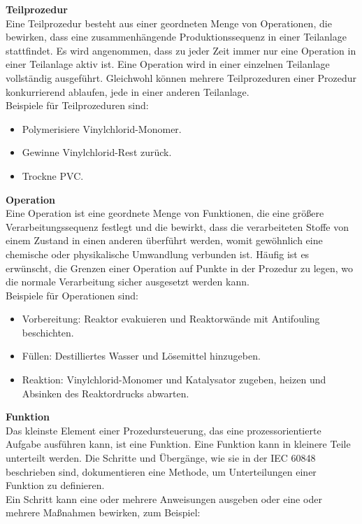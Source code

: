 \textbf{Teilprozedur}\\
Eine Teilprozedur besteht aus einer geordneten Menge von Operationen, die bewirken, dass eine zusammenhängende Produktionssequenz in einer Teilanlage stattfindet. Es wird angenommen, dass zu jeder Zeit immer nur eine Operation in einer Teilanlage aktiv ist. Eine Operation wird in einer einzelnen Teilanlage vollständig ausgeführt. Gleichwohl können mehrere Teilprozeduren einer Prozedur konkurrierend ablaufen, jede in einer anderen Teilanlage.\\ 
Beispiele für Teilprozeduren sind:
\begin{itemize}
	\item Polymerisiere Vinylchlorid-Monomer.
	\item Gewinne Vinylchlorid-Rest zurück.
	\item Trockne PVC.
\end{itemize}
\textbf{Operation}\\
Eine Operation ist eine geordnete Menge von Funktionen, die eine größere Verarbeitungssequenz festlegt und die bewirkt, dass die verarbeiteten Stoffe von einem Zustand in einen anderen überführt werden, womit gewöhnlich eine chemische oder physikalische Umwandlung verbunden ist. Häufig ist es erwünscht, die Grenzen einer Operation auf Punkte in der Prozedur zu legen, wo die normale Verarbeitung sicher ausgesetzt werden kann.\\ 
Beispiele für Operationen sind: 
\begin{itemize}
	\item Vorbereitung: Reaktor evakuieren und Reaktorwände mit Antifouling beschichten.
	\item Füllen: Destilliertes Wasser und Lösemittel hinzugeben.
	\item Reaktion: Vinylchlorid-Monomer und Katalysator zugeben, heizen und Absinken des Reaktordrucks abwarten.
\end{itemize}
\textbf{Funktion}\\
Das kleinste Element einer Prozedursteuerung, das eine prozessorientierte Aufgabe ausführen kann, ist eine Funktion. Eine Funktion kann in kleinere Teile unterteilt werden. Die Schritte und Übergänge, wie sie in der IEC 60848 beschrieben sind, dokumentieren eine Methode, um Unterteilungen einer Funktion zu definieren.\\
Ein Schritt kann eine oder mehrere Anweisungen ausgeben oder eine oder mehrere Maßnahmen bewirken, zum Beispiel:
